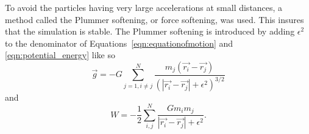 \documentclass[12pt]{report}
\begin{document}
To avoid the particles having very large accelerations at small distances, a method called the Plummer softening, or force softening, was used. This insures that the simulation is stable. The Plummer softening is introduced by adding $\epsilon^2$ to the denominator of Equations~\ref{eqn:equationofmotion} and \ref{eqn:potential_energy} like so
\begin{equation} \label{eqn:plummersofteningeqnofmoiton}
\vec{g} = -G \sum_{j=1, i \neq j}^{N} \frac{m_j \left( \vec{r_i} - \vec{r_j} \right)}{(| \vec{r_i} - \vec{r_j} | + \epsilon^2 )^{3/2}}
\end{equation}
and 
\begin{equation}\label{eqn:potenitalsoftening}
    W = - \frac{1}{2} \sum_{i,j}^{N}
\frac{Gm_im_j}{| \vec{r_i} - \vec{r_j} | + \epsilon^2} .
\end{equation}
\end{document}

